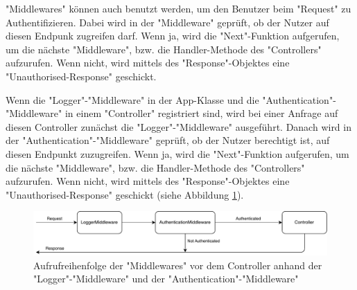 "Middlewares" können auch benutzt werden, um den Benutzer beim "Request" zu Authentifizieren. Dabei wird in der "Middleware" geprüft, ob der Nutzer auf diesen Endpunk zugreifen darf. Wenn ja, wird die "Next"-Funktion aufgerufen, um die nächste "Middleware", bzw. die Handler-Methode des "Controllers" aufzurufen. Wenn nicht, wird mittels des "Response"-Objektes eine "Unauthorised-Response" geschickt.

Wenn die "Logger"-"Middleware" in der App-Klasse und die "Authentication"-"Middleware" in einem "Controller" registriert sind, wird bei einer Anfrage auf diesen Controller zunächst die "Logger"-"Middleware" ausgeführt. Danach wird in der "Authentication"-"Middleware" geprüft, ob der Nutzer berechtigt ist, auf diesen Endpunkt zuzugreifen. Wenn ja, wird die "Next"-Funktion aufgerufen, um die nächste "Middleware", bzw. die Handler-Methode des "Controllers" aufzurufen. Wenn nicht, wird mittels des "Response"-Objektes eine "Unauthorised-Response" geschickt (siehe Abbildung \ref{fig:authMiddleware}).

\begin{figure}[H]
    \centering
    \includegraphics[width=15cm]{media/APITemplate/AuthMiddleware.svg.pdf}
    \caption{Aufrufreihenfolge der "Middlewares" vor dem Controller anhand der "Logger"-"Middleware" und der "Authentication"-"Middleware" } 
    \label{fig:authMiddleware}
\end{figure}

